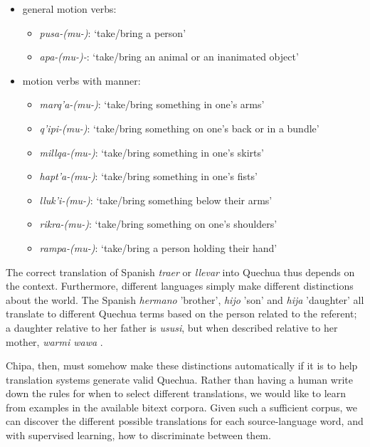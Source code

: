 \begin{itemize}
\renewcommand{\labelitemii}{$\bullet$}
 \item[] general motion verbs:
 \begin{itemize}
 \item {\em pusa-(mu-)}: `take/bring a person'
 \item {\em apa-(mu-)-}: `take/bring an animal or an inanimated object'
 \end{itemize}
 \item[] motion verbs with manner:
 \begin{itemize}
 \item {\em marq'a-(mu-)}: `take/bring something in one's arms'
 \item {\em q'ipi-(mu-)}:  `take/bring something on one's back or in a bundle'
 \item {\em millqa-(mu-)}: `take/bring something in one's skirts'
 \item {\em hapt'a-(mu-)}: `take/bring something in one's fists'
 \item {\em lluk'i-(mu-)}: `take/bring something below their arms'
 \item {\em rikra-(mu-)}:  `take/bring something on one's shoulders'
 \item {\em rampa-(mu-)}:  `take/bring a person holding their hand'
 \end{itemize}
\end{itemize}

The correct translation of Spanish {\em traer} or {\em llevar} into Quechua
thus depends on the context. Furthermore, different languages simply make
different distinctions about
the world. The Spanish \emph{hermano} 'brother', \emph{hijo} 'son' and
\emph{hija} 'daughter' all translate to different Quechua terms based on the
person related to the referent; a daughter relative to her father is
\emph{ususi}, but when described relative to her mother, \emph{warmi wawa}
\cite{academiamayor}.

Chipa, then, must somehow make these distinctions automatically if it is to
help translation systems generate valid Quechua.
Rather than having a human write down the rules for when to select different
translations, we would like to learn from examples in the available bitext
corpora.
Given such a sufficient corpus, we can discover the different possible
translations for each source-language word, and with supervised learning, how
to discriminate between them.


